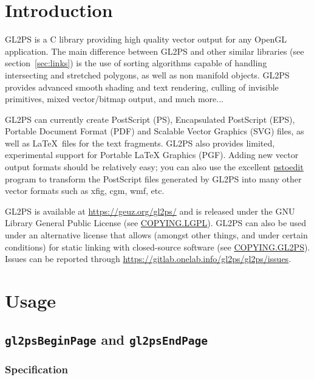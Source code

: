 \tableofcontents

\section{Introduction}

GL2PS is a C library providing high quality vector output for any OpenGL
application. The main difference between GL2PS and other similar libraries (see
section~\ref{sec:links}) is the use of sorting algorithms capable of handling
intersecting and stretched polygons, as well as non manifold objects. GL2PS
provides advanced smooth shading and text rendering, culling of invisible
primitives, mixed vector/bitmap output, and much more...

GL2PS can currently create PostScript (PS), Encapsulated PostScript (EPS),
Portable Document Format (PDF) and Scalable Vector Graphics (SVG) files, as well
as \LaTeX\ files for the text fragments. GL2PS also provides limited,
experimental support for Portable LaTeX Graphics (PGF). Adding new vector output
formats should be relatively easy; you can also use the excellent
\href{http://www.pstoedit.net}{pstoedit} program to transform the PostScript
files generated by GL2PS into many other vector formats such as xfig, cgm, wmf,
etc.

GL2PS is available at \url{https://geuz.org/gl2ps/} and is released under the
GNU Library General Public License (see
\href{https://geuz.org/gl2ps/COPYING.LGPL}{COPYING.LGPL}). GL2PS can also be
used under an alternative license that allows (amongst other things, and under
certain conditions) for static linking with closed-source software (see
\href{https://geuz.org/gl2ps/COPYING.GL2PS}{COPYING.GL2PS}).  Issues can be
reported through \url{https://gitlab.onelab.info/gl2ps/gl2ps/issues}.

\section{Usage}


\subsection{\texttt{gl2psBeginPage} and \texttt{gl2psEndPage}}
\label{sec:gl2psBeginPage}

\subsubsection{Specification}

